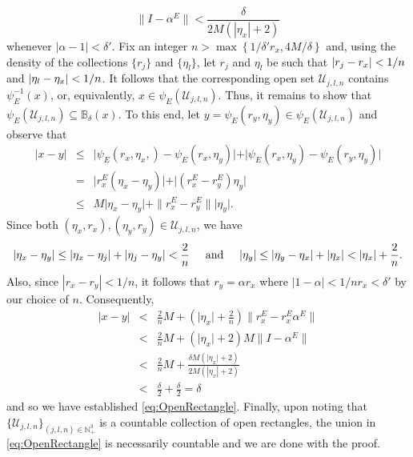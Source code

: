 \documentclass[smallextended]{svjour3}
\theoremstyle{remark}
\renewenvironment{proof}[1][\proofname]{\renewcommand\xproofname{#1}\xproof}{\endxproof}
\begin{document}
\begin{proof}
\begin{equation*}
\|I-\alpha ^E\|< \frac{\delta}{2M (  |\eta_x|+2)}
\end{equation*}
whenever $|\alpha-1|<\delta'$. Fix an integer $n>\max \left\{1/\delta'r_x, 4M/\delta \right\}$ and, using the density of the collections $\{r_j\}$ and $\{\eta_l\}$, let $r_j$ and $ \eta_l$ be such that $\abs{r_j - r_x } < 1/n$ and $\abs{\eta_l - \eta_x} < 1/n$. It follows that the corresponding open set $\mathcal{U}_{j,l,n}$ contains $\psi_E^{-1}(x)$, or, equivalently, $x\in \psi_E(\mathcal{U}_{j,l,n})$. Thus, it remains to show that $\psi_E(\mathcal{U}_{j,l,n}) \subseteq \mathbb{B}_\delta(x)$. To this end, let $y=\psi_E(r_y,\eta_y)\in\psi_E(\mathcal{U}_{j,l,n})$ and observe that
\begin{eqnarray*}
| x - y | &\leq& \vert \psi_E(r_x,\eta_x,) - \psi_E(r_x,\eta_y) \vert 
    + \vert \psi_E(r_x,\eta_y) - \psi_E(r_y,\eta_y) \vert\\
    &=&  \vert r_x^E (\eta_x - \eta_y) \vert + \vert (r_x^E - r_y^E) \eta_y \vert\\
    &\leq& M\vert \eta_x - \eta_y \vert + \|{r_x^E - r_y^E}\|  \vert \eta_y \vert.
\end{eqnarray*}
Since both $(\eta_x,r_x),(\eta_y,r_y) \in \mathcal{U}_{j,l,n}$, we have
\begin{equation*}
    \vert \eta_x - \eta_y \vert \leq \vert \eta_x - \eta_j \vert + \vert \eta_j - \eta_y \vert < \frac{2}{n}
\hspace{.5cm}\mbox{and}\hspace{.5cm}
    \vert \eta_y \vert \leq \vert \eta_y - \eta_x \vert + \vert \eta_x \vert < \vert \eta_x \vert + \frac{2}{n}.
\end{equation*}
Also, since $|r_x-r_y|<1/n$, it follows that $r_y=\alpha r_x$ where $|1-\alpha|<1/nr_x < \delta'$ by our choice of $n$. Consequently,
\begin{eqnarray*}
    \vert x - y \vert 
    &< & \frac{2}{n} M+ \left( \vert \eta_x \vert + \frac{2}{n} \right) \|{r_x^E -  r_x^E \alpha^E}\|   \\ 
    &<& \frac{2}{n}M + \left( \vert \eta_x \vert + 2 \right)M\| I - \alpha^E\| \\
    &<&  \frac{2}{n}M +  \frac{\delta M \left( \vert \eta_x \vert + 2\right) }{2M (| \eta_x | + 2)}  \\
    &<& \frac{\delta}{2} + \frac{\delta}{2}=\delta 
\end{eqnarray*}
and so we have established \eqref{eq:OpenRectangle}. Finally, upon noting that $\{\mathcal{U}_{j,l,n}\}_{(j,l,n)\in\mathbb{N}_+^3}$ is a countable collection of open rectangles, the union in \eqref{eq:OpenRectangle} is necessarily countable and we are done with the proof.
\end{proof}
\end{document}
